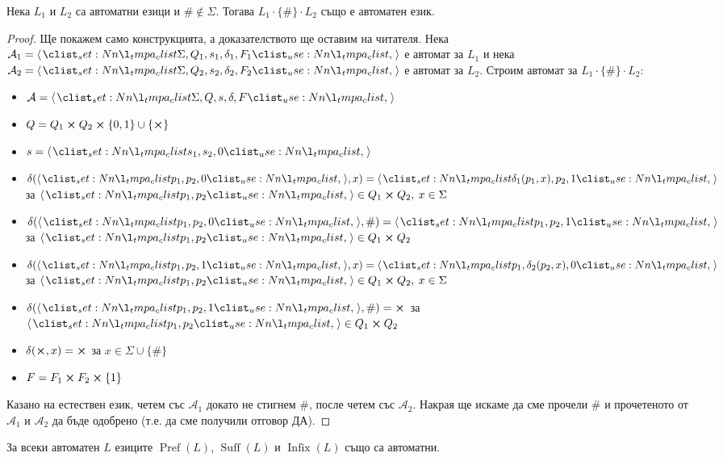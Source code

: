 \pagebreak

\begin{claim}
    Нека $L_1$ и $L_2$ са автоматни езици и $\# \notin \Sigma$.
    Тогава $L_1 \cdot \{ \# \} \cdot L_2$ също е автоматен език.
\end{claim}

\begin{proof}
    Ще покажем само конструкцията, а доказателството ще оставим на читателя.
    Нека $\mathcal{A}_1 = \opair{\Sigma, Q_1, s_1, \delta_1, F_1}$ е автомат за $L_1$ и нека $\mathcal{A}_2 = \opair{\Sigma, Q_2, s_2, \delta_2, F_2}$ е автомат за $L_2$.
    Строим автомат за $L_1 \cdot \{ \# \} \cdot L_2$:
    \begin{itemize}
        \item $\mathcal{A} = \opair{\Sigma, Q, s, \delta, F}$
        \item $Q = Q_1 \cross Q_2 \cross \{ 0, 1 \} \cup \{ \cross \}$
        \item $s = \opair{s_1, s_2, 0}$
        \item $\delta(\opair{p_1, p_2, 0}, x) = \opair{\delta_1(p_1, x), p_2, 1}$ за $\opair{p_1, p_2} \in Q_1 \cross Q_2, \: x \in \Sigma$
        \item $\delta(\opair{p_1, p_2, 0}, \#) = \opair{p_1, p_2, 1}$ за $\opair{p_1, p_2} \in Q_1 \cross Q_2$
        \item $\delta(\opair{p_1, p_2, 1}, x) = \opair{p_1, \delta_2(p_2, x), 0}$ за $\opair{p_1, p_2} \in Q_1 \cross Q_2, \: x \in \Sigma$
        \item $\delta(\opair{p_1, p_2, 1}, \#) = \cross$ за $\opair{p_1, p_2} \in Q_1 \cross Q_2$
        \item $\delta(\cross, x) = \cross$ за $x \in \Sigma \cup \{ \# \}$
        \item $F = F_1 \cross F_2 \cross \{ 1 \}$
    \end{itemize}

    Казано на естествен език, четем със $\mathcal{A}_1$ докато не стигнем $\#$, после четем със $\mathcal{A}_2$.
    Накрая ще искаме да сме прочели $\#$ и прочетеното от $\mathcal{A}_1$ и $\mathcal{A}_2$ да бъде одобрено (т.е. да сме получили отговор ДА).
\end{proof}

\pagebreak

\begin{claim}
    За всеки автоматен $L$ езиците $\operatorname{Pref}(L)$, $\operatorname{Suff}(L)$ и $\operatorname{Infix}(L)$ също са автоматни.
\end{claim}

